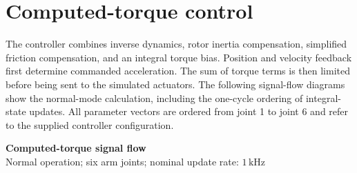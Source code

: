 \documentclass[11pt,a4paper]{report}
\newcommand{\sat}{\operatorname{sat}}
\newcommand{\RNEA}{\operatorname{RNEA}}
\begin{document}
\chapter{Computed-torque control}\label{ch:control}
The controller combines inverse dynamics, rotor inertia compensation,
simplified friction compensation, and an integral torque bias. Position and
velocity feedback first determine commanded acceleration. The sum of torque
terms is then limited before being sent to the simulated actuators.
The following signal-flow diagrams show the normal-mode calculation,
including the one-cycle ordering of integral-state updates. All parameter
vectors are ordered from joint 1 to joint 6 and refer to the supplied
controller configuration.
\begin{landscape}


\begin{center}
  {\Large\bfseries Computed-torque signal flow}\\[2mm]
  {Normal operation; six arm joints; nominal update rate: $1\,\mathrm{kHz}$}
\end{center}

\begin{figure}[ht]
\centering
{}
\end{figure}
\end{landscape}
\end{document}
